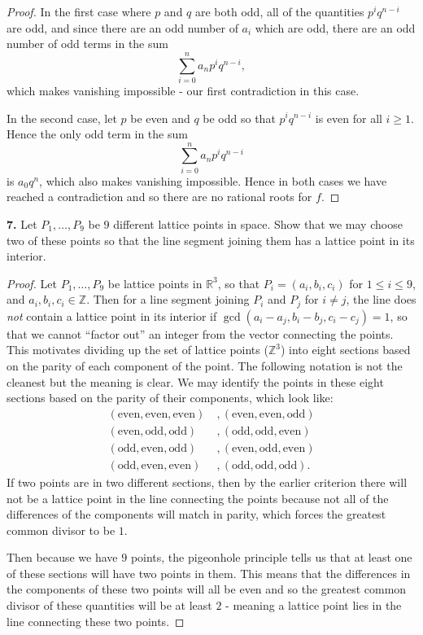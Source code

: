 \documentclass[11pt]{article}
\begin{document}
\begin{proof}
    In the first case where $p$ and $q$ are both odd, all of the quantities $p^{i}q^{n-i}$ are odd, and since there are an odd number of $a_i$ which are odd, there are an odd number of odd terms in the sum \[\sum_{i=0}^n a_np^{i}q^{n-i},\] which makes vanishing impossible - our first contradiction in this case.

    In the second case, let $p$ be even and $q$ be odd so that $p^{i}q^{n-i}$ is even for all $i\geq 1$. Hence the only odd term in the sum \[\sum_{i=0}^n a_np^{i}q^{n-i}\] is $a_0q^n$, which also makes vanishing impossible. Hence in both cases we have reached a contradiction and so there are no rational roots for $f$.
\end{proof}

\textbf{7.} Let $P_1,\dots,P_9$ be $9$ different lattice points in space. Show that we may choose two of these points so that the line segment joining them has a lattice point in its interior.

\begin{proof}
    Let $P_1,\dots,P_9$ be lattice points in $\mathbb{R}^3$, so that $P_i = (a_i,b_i,c_i)$ for $1\leq i \leq 9$, and $a_i,b_i,c_i\in\mathbb{Z}$. Then for a line segment joining $P_i$ and $P_j$ for $i\neq j$, the line does \textit{not} contain a lattice point in its interior if $\gcd(a_i-a_j, b_i-b_j, c_i-c_j) = 1$, so that we cannot ``factor out'' an integer from the vector connecting the points. This motivates dividing up the set of lattice points ($\mathbb{Z}^3$) into eight sections based on the parity of each component of the point. The following notation is not the cleanest but the meaning is clear. We may identify the points in these eight sections based on the parity of their components, which look like:\begin{align*}
        (\text{even},\text{even},\text{even}) &~, (\text{even},\text{even},\text{odd}) \\
        (\text{even},\text{odd},\text{odd}) &~, (\text{odd},\text{odd},\text{even}) \\
        (\text{odd},\text{even},\text{odd}) &~, (\text{even},\text{odd},\text{even}) \\
        (\text{odd},\text{even},\text{even}) &~, (\text{odd},\text{odd},\text{odd}) .\end{align*} If two points are in two different sections, then by the earlier criterion there will not be a lattice point in the line connecting the points because not all of the differences of the components will match in parity, which forces the greatest common divisor to be $1$.

        Then because we have $9$ points, the pigeonhole principle tells us that at least one of these sections will have two points in them. This means that the differences in the components of these two points will all be even and so the greatest common divisor of these quantities will be at least $2$ - meaning a lattice point lies in the line connecting these two points.
\end{proof}
\end{document}
